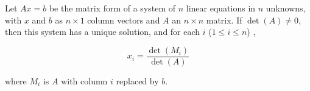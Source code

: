 \documentclass{article}
\begin{document}
Let $Ax=b$ be the matrix form of a system of $n$ linear equations in $n$ unknowns, with $x$ and $b$ as $n\times 1$ column vectors and $A$ an $n \times n$ matrix. If $\det(A)\ne 0$, then this system has a unique solution, and for each $i$ ($1\le i \le n$) ,

$$ x_i = \frac{\det(M_i)}{\det(A)} $$

where $M_i$ is $A$ with column $i$ replaced by $b$.
\end{document}
